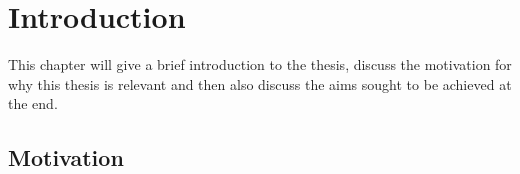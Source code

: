 \chapter{Introduction}

This chapter will give a brief introduction to the thesis, discuss the motivation for why this thesis is relevant and then also discuss the aims sought to be achieved at the end.

\section{Motivation}










